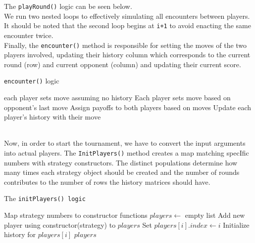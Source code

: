 \documentclass[12pt]{report}
\begin{document}
The \texttt{playRound()} logic can be seen below.\\We run two nested loops to effectively simulating all encounters between players. It should be noted that the second loop begins at \texttt{i+1} to avoid enacting the same encounter twice.\\
Finally, the \texttt{encounter()} method is responsible for setting the moves of the two players involved, updating their history column which corresponds to the current round (row) and current opponent (column) and updating their current score.
\begin{algorithm}
\caption{\texttt{encounter()} logic}
\begin{algorithmic}[1]
   \State each player sets move assuming no history
  \Else 
    \State Each player sets move based on opponent's last move
  \EndIf
  \State Assign payoffs to both players based on moves
  \State Update each player's history with their move     
\EndFunction
\end{algorithmic}
\end{algorithm}
\\Now, in order to start the tournament, we have to convert the input arguments into actual players. The \texttt{InitPlayers()} method creates a map matching specIfic numbers with strategy constructors. The distinct populations determine how many times each strategy object should be created and the number of rounds contributes to the number of rows the history matrices should have.
\newpage
\begin{algorithm}
\caption{The \texttt{initPlayers() logic}}
\begin{algorithmic}[1]
\State Map strategy numbers to constructor functions
\State $players \gets$ empty list
        \State Add new player using constructor(strategy) to $players$
      \EndFor
   \Else
       \State {}
   \EndIf
\EndFor
{}
\State Set $players[i].index \gets i$
\State Initialize history for $players[i]$
\EndFor
\State \Return $players$
\end{algorithmic}
\end{algorithm}
\end{document}
